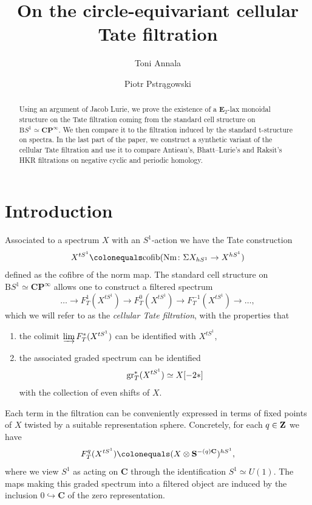\documentclass[oneside,a4paper]{amsart}
\begin{document}
\title{On the circle-equivariant cellular Tate filtration}
\author{Toni Annala}
\author{Piotr Pstr\k{a}gowski}

\begin{abstract}
Using an argument of Jacob Lurie, we prove the existence of a $\mathbf{E}_{2}$-lax monoidal structure on the Tate filtration coming from the standard cell structure on $\mathrm{B}S^{1} \simeq \mathbf{CP}^{\infty}$. We then compare it to the filtration induced by the standard t-structure on spectra. In the last part of the paper, we construct a synthetic variant of the cellular Tate filtration and use it to compare Antieau's, Bhatt--Lurie's and Raksit's HKR filtrations on negative cyclic and periodic homology. 
\end{abstract}


\maketitle

\tableofcontents

\section{Introduction} 

Associated to a spectrum $X$ with an $S^1$-action we have the Tate construction
\[
X^{t S^{1}} \colonequals \mathrm{cofib}(\mathrm{Nm} \colon \Sigma X_{hS^{1}} \rightarrow X^{hS^{1}}) 
\]
defined as the cofibre of the norm map. The standard cell structure on $\mathrm{B}S^{1} \simeq \mathbf{CP}^{\infty}$ allows one to construct a filtered spectrum 
\[
\ldots \rightarrow F_{T}^{1}(X^{tS^{1}}) \rightarrow F_{T}^{0}(X^{tS^{1}}) \rightarrow F_{T}^{-1}(X^{tS^{1}}) \rightarrow \ldots,
\]
which we will refer to as the \emph{cellular Tate filtration}, with the properties that 
\begin{enumerate}
    \item the colimit $\varinjlim F_{T}^{\ast}(X^{tS^{1}})$ can be identified with $X^{tS^{1}}$, 
    \item the associated graded spectrum can be identified
    \[
    \operatorname{gr}_{T}^{\ast}(X^{tS^{1}}) \simeq X[-2 \ast] 
    \]
    with the collection of even shifts of $X$. 
\end{enumerate}
Each term in the filtration can be conveniently expressed in terms of fixed points of $X$ twisted by a suitable representation sphere. Concretely, for each $q \in \mathbf{Z}$ we have 
\begin{equation}
\label{equation:formula_for_the_tate_construction}
F_{T}^{q}(X^{tS^{1}}) \colonequals (X \otimes \thesphere^{-(q) \mathbf{C}})^{h S^{1}}, 
\end{equation}
where we view $S^{1}$ as acting on $\mathbf{C}$ through the identification $S^{1} \simeq U(1)$. The maps making this graded spectrum into a filtered object are induced by the inclusion $0 \hookrightarrow \mathbf{C}$ of the zero representation. 
\end{document}
